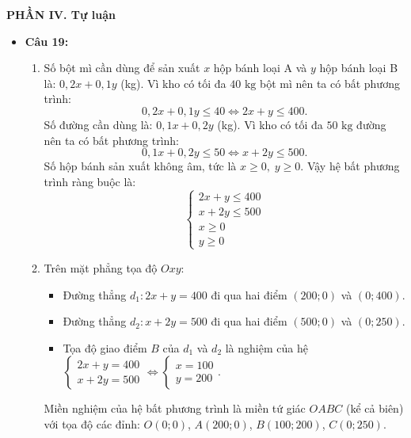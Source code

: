 \documentclass[12pt,a4paper]{article}
\begin{document}
\vspace{0.15cm}
\textbf{PHẦN IV. Tự luận}
\begin{itemize}[leftmargin=0.6cm, itemsep=2.5pt]
    \item \textbf{Câu 19:}
    \begin{enumerate}
        \item Số bột mì cần dùng để sản xuất $x$ hộp bánh loại A và $y$ hộp bánh loại B là: $0{,}2x + 0{,}1y$ (kg). Vì kho có tối đa $40\text{ kg}$ bột mì nên ta có bất phương trình:
        \[
        0{,}2x + 0{,}1y \le 40 \iff 2x + y \le 400.
        \]
        Số đường cần dùng là: $0{,}1x + 0{,}2y$ (kg). Vì kho có tối đa $50\text{ kg}$ đường nên ta có bất phương trình:
        \[
        0{,}1x + 0{,}2y \le 50 \iff x + 2y \le 500.
        \]
        Số hộp bánh sản xuất không âm, tức là $x \ge 0,\; y \ge 0$.
        Vậy hệ bất phương trình ràng buộc là:
        \[
        \begin{cases}
        2x + y \le 400 \\
        x + 2y \le 500 \\
        x \ge 0 \\
        y \ge 0
        \end{cases}
        \]
        \item Trên mặt phẳng tọa độ $Oxy$:
        \begin{itemize}
            \item Đường thẳng $d_1: 2x + y = 400$ đi qua hai điểm $(200; 0)$ và $(0; 400)$.
            \item Đường thẳng $d_2: x + 2y = 500$ đi qua hai điểm $(500; 0)$ và $(0; 250)$.
            \item Tọa độ giao điểm $B$ của $d_1$ và $d_2$ là nghiệm của hệ $\begin{cases} 2x + y = 400 \\ x + 2y = 500 \end{cases} \iff \begin{cases} x = 100 \\ y = 200 \end{cases}$.
        \end{itemize}
        Miền nghiệm của hệ bất phương trình là miền tứ giác $OABC$ (kể cả biên) với tọa độ các đỉnh: $O(0; 0)$, $A(200; 0)$, $B(100; 200)$, $C(0; 250)$.
    \end{enumerate}


\end{itemize}
\end{document}
